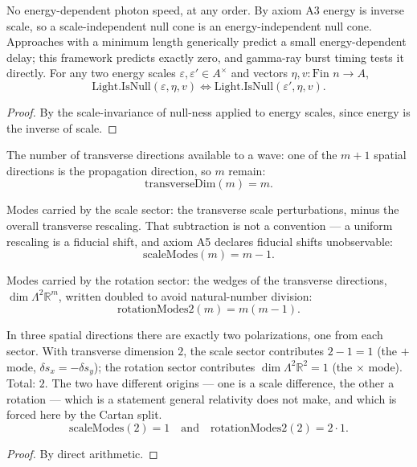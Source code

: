 \begin{theorem}
No energy-dependent photon speed, at any order. By axiom A3 energy is inverse scale, so a scale-independent null cone is an energy-independent null cone. Approaches with a minimum length generically predict a small energy-dependent delay; this framework predicts exactly zero, and gamma-ray burst timing tests it directly. For any two energy scales $\varepsilon, \varepsilon' \in A^\times$ and vectors $\eta, v : \text{Fin } n \to A$,
\[
\text{Light.IsNull}(\varepsilon, \eta, v) \iff \text{Light.IsNull}(\varepsilon', \eta, v).
\]
\begin{proof}
By the scale-invariance of null-ness applied to energy scales, since energy is the inverse of scale.
\end{proof}
\end{theorem}

\begin{definition}
The number of transverse directions available to a wave: one of the $m+1$ spatial directions is the propagation direction, so $m$ remain:
\[
\text{transverseDim}(m) = m.
\]
\end{definition}

\begin{definition}
Modes carried by the scale sector: the transverse scale perturbations, minus the overall transverse rescaling. That subtraction is not a convention — a uniform rescaling is a fiducial shift, and axiom A5 declares fiducial shifts unobservable:
\[
\text{scaleModes}(m) = m - 1.
\]
\end{definition}

\begin{definition}
Modes carried by the rotation sector: the wedges of the transverse directions, $\dim \Lambda^2 \mathbb{R}^m$, written doubled to avoid natural-number division:
\[
\text{rotationModes2}(m) = m(m-1).
\]
\end{definition}

\begin{theorem}
In three spatial directions there are exactly two polarizations, one from each sector. With transverse dimension $2$, the scale sector contributes $2 - 1 = 1$ (the $+$ mode, $\delta s_x = -\delta s_y$); the rotation sector contributes $\dim \Lambda^2 \mathbb{R}^2 = 1$ (the $\times$ mode). Total: $2$. The two have different origins — one is a scale difference, the other a rotation — which is a statement general relativity does not make, and which is forced here by the Cartan split.
\[
\text{scaleModes}(2) = 1 \quad \text{and} \quad \text{rotationModes2}(2) = 2 \cdot 1.
\]
\begin{proof}
By direct arithmetic.
\end{proof}
\end{theorem}

